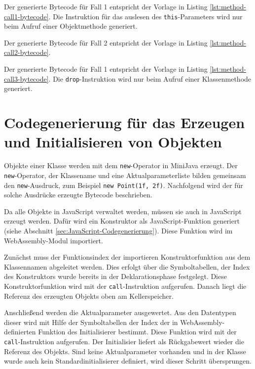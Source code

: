 Der generierte Bytecode für Fall 1 entspricht der Vorlage in Listing \ref{lst:method-call1-bytecode}. Die Instruktion für das auslesen des \lstinline{this}-Parameters wird nur beim Aufruf einer Objektmethode generiert.

Der generierte Bytecode für Fall 2 entspricht der Vorlage in Listing \ref{lst:method-call2-bytecode}.

Der generierte Bytecode für Fall 1 entspricht der Vorlage in Listing \ref{lst:method-call3-bytecode}. Die \lstinline{drop}-Instruktion wird nur beim Aufruf einer Klassenmethode generiert.







\section{Codegenerierung für das Erzeugen und Initialisieren von Objekten}
Objekte einer Klasse werden mit dem \lstinline{new}-Operator in MiniJava erzeugt. Der \lstinline{new}-Operator, der Klassename und eine Aktualparameterliste bilden gemeinsam den \lstinline{new}-Ausdruck, zum Beispiel \lstinline{new Point(1f, 2f)}. Nachfolgend wird der für solche Ausdrücke erzeugte Bytecode beschrieben.

Da alle Objekte in JavaScript verwaltet werden, müssen sie auch in JavaScript erzeugt werden. Dafür wird ein Konstruktor als JavaScript-Funktion generiert (siehe Abschnitt \ref{sec:JavaScript-Codegenerierung}). Diese Funktion wird im WebAssembly-Modul importiert.

Zunächst muss der Funktionsindex der importieren Konstruktorfunktion aus dem Klassennamen abgeleitet werden. Dies erfolgt über die Symboltabellen, der Index des Konstruktors wurde bereits in der Deklarationsphase festgelegt. Diese Konstruktorfunktion wird mit der \lstinline{call}-Instruktion aufgerufen. Danach liegt die Referenz des erzeugten Objekts oben am Kellerspeicher.

Anschließend werden die Aktualparameter ausgewertet. Aus den Datentypen dieser wird mit Hilfe der Symboltabellen der Index der in WebAssembly-definierten Funktion des Initialisierer bestimmt. Diese Funktion wird mit der \lstinline{call}-Instruktion aufgerufen. Der Initialisier liefert als Rückgabewert wieder die Referenz des Objekts. Sind keine Aktualparameter vorhanden und in der Klasse wurde auch kein Standardinitialisierer definiert, wird dieser Schritt übersprungen.

